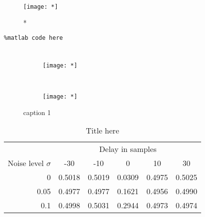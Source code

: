 \documentclass[../main.tex]{subfiles}
\begin{document}
\begin{figure}[*]
  \centering
  \texttt{[image: *]}\\
  \caption{*}\label{*}
\end{figure}

\begin{lstlisting}
%matlab code here
\end{lstlisting}


\begin{equation}\label{equ:1}
\begin{split}
    &\\
    &
\end{split}
\end{equation}

\begin{figure}[h]
    \centering
    \begin{subfigure}[b]{0.45\textwidth}
        \texttt{[image: *]}
    \end{subfigure}
    ~
    \begin{subfigure}[b]{0.45\textwidth}
        \texttt{[image: *]}
    \end{subfigure}
    \caption{caption 1}
    \label{fig:*}
\end{figure}

\begin{table}[h]
    \centering
    \caption{Title here}
    \label{tab:*}
    \begin{tabular}{r|ccccc}
           &        \multicolumn{5}{c}{Delay in samples}       \\
    Noise level $\sigma$ & -30    & -10    & 0      & 10     & 30     \\ \hline
    0      & 0.5018 & 0.5019 & 0.0309 & 0.4975 & 0.5025 \\
    0.05   & 0.4977 & 0.4977 & 0.1621 & 0.4956 & 0.4990 \\
    0.1    & 0.4998 & 0.5031 & 0.2944 & 0.4973 & 0.4974
    \end{tabular}
\end{table}
\end{document}

